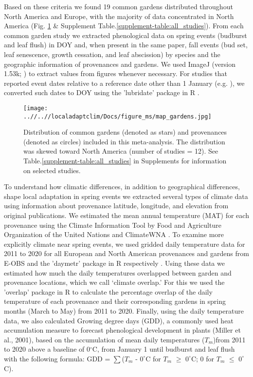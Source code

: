 \documentclass{article}
\begin{document}
Based on these criteria we found 19 common gardens distributed throughout North America and Europe, with the majority of data concentrated in North America (Fig. \ref{figure:map_gardens} \& Supplement Table.\ref{supplement-table:all_studies}). From each common garden study we extracted phenological data on spring events (budburst and leaf flush) in DOY and, when present in the same paper, fall events (bud set, leaf senescence, growth cessation, and leaf abscission) by species and the geographic information of provenances and gardens. We used ImageJ (version 1.53k; \citealp{schneider_rasband_eliceiri_2012}) to extract values from figures whenever necessary. For studies that reported event dates relative to a reference date other than 1 January (e.g. \citealp{Rehfeldt1994}), we converted such dates to DOY using the 'lubridate' package in R \citep{Grolemund11}.
\begin{figure}[!h] 
    \centering
 \texttt{[image: ..//..//localadaptclim/Docs/figure\_ms/map\_gardens.jpg]}
    \caption{Distribution of common gardens (denoted as stars) and provenances (denoted as circles) included in this meta-analysis. The distribution was skewed toward North America (number of studies = 12). See Table.\ref{supplement-table:all_studies} in Supplements for information on selected studies.} 
    \label{figure:map_gardens}
\end{figure}
\newline
To understand how climatic differences, in addition to geographical differences, shape local adaptation in spring events we extracted several types of climate data using information about provenance latitude, longitude, and elevation from original publications. We estimated the mean annual temperature (MAT) for each provenance using the Climate Information Tool by Food and Agriculture Organization of the United Nations \citep{FAO2022}and ClimateWNA \citep{wang2016}. To examine more explicitly climate near spring events, we used gridded daily temperature data for 2011 to 2020 for all European and North American provenances and gardens from E-OBS and the 'daymetr' package in R respectively \citep{cornes2018,hufkens2018}. Using these data we estimated how much the daily temperatures overlapped between garden and provenance locations, which we call `climate overlap.' For this we used the 'overlap' package in R to calculate the percentage overlap of the daily temperature of each provenance and their corresponding gardens in spring months (March to May) from 2011 to 2020. Finally, using the daily temperature data, we also calculated Growing degree days (GDD), a commonly used heat accumulation measure to forecast phenological development in plants (Miller et al., 2001), based on the accumulation of mean daily temperatures ($T_{m}$)from 2011 to 2020 above a baseline of 0$^{\circ}$C, from January 1 until budburst and leaf flush with the following formula: GDD = $\sum$($T_{m}$ - $0^{\circ}$C for $T_{m}$ $\ge$ $0^{\circ}$C; 0 for $T_{m}$ $\le$ $0^{\circ}$C).
\end{document}
